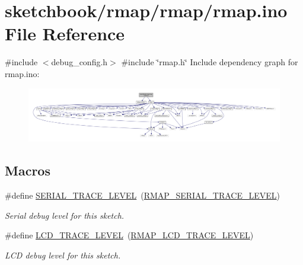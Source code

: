 \hypertarget{rmap_8ino}{}\section{sketchbook/rmap/rmap/rmap.ino File Reference}
\label{rmap_8ino}
{\ttfamily \#include $<$debug\+\_\+config.\+h$>$}\newline
{\ttfamily \#include \char`\"{}rmap.\+h\char`\"{}}\newline
Include dependency graph for rmap.\+ino\+:\nopagebreak
\begin{figure}[H]
\begin{center}
\leavevmode
\includegraphics[width=350pt]{rmap_8ino__incl}
\end{center}
\end{figure}
\subsection*{Macros}
\begin{DoxyCompactItemize}
\item 
\mbox{\label{rmap_8ino_a31fa5c36fa17c66feec7a67b76c3e786}} 
\#define \hyperlink{rmap_8ino_a31fa5c36fa17c66feec7a67b76c3e786}{S\+E\+R\+I\+A\+L\+\_\+\+T\+R\+A\+C\+E\+\_\+\+L\+E\+V\+EL}~(\hyperlink{debug__config_8h_a911c268100400a6e1b419b0b79396e16}{R\+M\+A\+P\+\_\+\+S\+E\+R\+I\+A\+L\+\_\+\+T\+R\+A\+C\+E\+\_\+\+L\+E\+V\+EL})
\begin{DoxyCompactList}\small\item\em Serial debug level for this sketch. \end{DoxyCompactList}\item 
\mbox{\label{rmap_8ino_acb771fe8deeaa2fee1ad327c0c1be34f}} 
\#define \hyperlink{rmap_8ino_acb771fe8deeaa2fee1ad327c0c1be34f}{L\+C\+D\+\_\+\+T\+R\+A\+C\+E\+\_\+\+L\+E\+V\+EL}~(\hyperlink{debug__config_8h_a86050508a20f5b64f14679edbc3640ab}{R\+M\+A\+P\+\_\+\+L\+C\+D\+\_\+\+T\+R\+A\+C\+E\+\_\+\+L\+E\+V\+EL})
\begin{DoxyCompactList}\small\item\em L\+CD debug level for this sketch. \end{DoxyCompactList}\end{DoxyCompactItemize}
